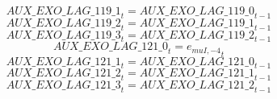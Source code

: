 \begin{dmath}
{AUX\_EXO\_LAG\_119\_1}_{t}={AUX\_EXO\_LAG\_119\_0}_{t-1}
\end{dmath}
\begin{dmath}
{AUX\_EXO\_LAG\_119\_2}_{t}={AUX\_EXO\_LAG\_119\_1}_{t-1}
\end{dmath}
\begin{dmath}
{AUX\_EXO\_LAG\_119\_3}_{t}={AUX\_EXO\_LAG\_119\_2}_{t-1}
\end{dmath}
\begin{dmath}
{AUX\_EXO\_LAG\_121\_0}_{t}={{e_{muI,-4}}}_{t}
\end{dmath}
\begin{dmath}
{AUX\_EXO\_LAG\_121\_1}_{t}={AUX\_EXO\_LAG\_121\_0}_{t-1}
\end{dmath}
\begin{dmath}
{AUX\_EXO\_LAG\_121\_2}_{t}={AUX\_EXO\_LAG\_121\_1}_{t-1}
\end{dmath}
\begin{dmath}
{AUX\_EXO\_LAG\_121\_3}_{t}={AUX\_EXO\_LAG\_121\_2}_{t-1}
\end{dmath}
